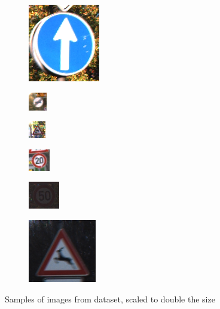 \documentclass[a4paper]{article}
\begin{document}
\begin{figure}
\begin{subfigure}{.5\textwidth}
  \centering
  \includegraphics[scale = 2]{a.png}
  \caption{}
  \label{fig:sfig1}
\end{subfigure}%
\begin{subfigure}{.5\textwidth}
  \centering
  \includegraphics[scale = 2]{b.png}
  \caption{}
  \label{fig:sfig2}
\end{subfigure}
\begin{subfigure}{.5\textwidth}
  \centering
  \includegraphics[scale = 2]{c.png}
  \caption{}
  \label{fig:sfig2}
\end{subfigure}
\begin{subfigure}{.5\textwidth}
  \centering
  \includegraphics[scale = 2]{d.png}
  \caption{}
  \label{fig:sfig2}
\end{subfigure}
\begin{subfigure}{.5\textwidth}
  \centering
  \includegraphics[scale = 2]{e.png}
  \caption{}
  \label{fig:sfig2}
\end{subfigure}
\begin{subfigure}{.5\textwidth}
  \centering
  \includegraphics[scale = 2]{f.png}
  \caption{}
  \label{fig:sfig2}
\end{subfigure}

\caption{Samples of images from dataset, scaled to double the size}
\label{fig:fig}
\end{figure}
\end{document}
